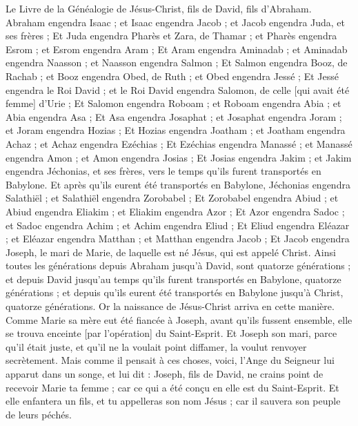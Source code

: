 \BFont
\begin{multicols}{2}
\VerseOne{}Le Livre de la Généalogie de Jésus-Christ, fils de David, fils d'Abraham.
Abraham engendra Isaac ; et Isaac engendra Jacob ; et Jacob engendra Juda, et ses frères ;
Et Juda engendra Pharès et Zara, de Thamar ; et Pharès engendra Esrom ; et Esrom engendra Aram ;
Et Aram engendra Aminadab ; et Aminadab engendra Naasson ; et Naasson engendra Salmon ;
Et Salmon engendra Booz, de Rachab ; et Booz engendra Obed, de Ruth ; et Obed engendra Jessé ;
Et Jessé engendra le Roi David ; et le Roi David engendra Salomon, de celle [qui avait été femme] d'Urie ;
Et Salomon engendra Roboam ; et Roboam engendra Abia ; et Abia engendra Asa ;
Et Asa engendra Josaphat ; et Josaphat engendra Joram ; et Joram engendra Hozias ;
Et Hozias engendra Joatham ; et Joatham engendra Achaz ; et Achaz engendra Ezéchias ;
Et Ezéchias engendra Manassé ; et Manassé engendra Amon ; et Amon engendra Josias ;
Et Josias engendra Jakim ; et Jakim engendra Jéchonias, et ses frères, vers le temps qu'ils furent transportés en Babylone.
Et après qu'ils eurent été transportés en Babylone, Jéchonias engendra Salathiël ; et Salathiël engendra Zorobabel ;
Et Zorobabel engendra Abiud ; et Abiud engendra Eliakim ; et Eliakim engendra Azor ;
Et Azor engendra Sadoc ; et Sadoc engendra Achim ; et Achim engendra Eliud ;
Et Eliud engendra Eléazar ; et Eléazar engendra Matthan ; et Matthan engendra Jacob ;
Et Jacob engendra Joseph, le mari de Marie, de laquelle est né Jésus, qui est appelé Christ.
Ainsi toutes les générations depuis Abraham jusqu'à David, sont quatorze générations ; et depuis David jusqu'au temps qu'ils furent transportés en Babylone, quatorze générations ; et depuis qu'ils eurent été transportés en Babylone jusqu'à Christ, quatorze générations.
Or la naissance de Jésus-Christ arriva en cette manière. Comme Marie sa mère eut été fiancée à Joseph, avant qu'ils fussent ensemble, elle se trouva enceinte [par l'opération] du Saint-Esprit.
Et Joseph son mari, parce qu'il était juste, et qu'il ne la voulait point diffamer, la voulut renvoyer secrètement.
Mais comme il pensait à ces choses, voici, l'Ange du Seigneur lui apparut dans un songe, et lui dit : Joseph, fils de David, ne crains point de recevoir Marie ta femme ; car ce qui a été conçu en elle est du Saint-Esprit.
Et elle enfantera un fils, et tu appelleras son nom Jésus ; car il sauvera son peuple de leurs péchés.

\end{multicols}
